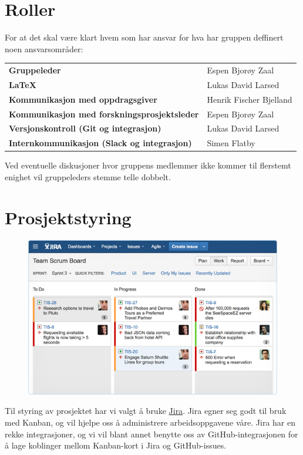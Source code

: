 \section{Roller}
For at det skal være klart hvem som har ansvar for hva har gruppen deffinert noen ansvarsområder:
\begin{flushleft}
\renewcommand{\arraystretch}{1.5}
\begin{tabular}[ht]{@{}ll@{}}
\textbf{Gruppeleder} & Espen Bjorøy Zaal \\
\textbf{LaTeX} & Lukas David Larsed \\
\textbf{Kommunikasjon med oppdragsgiver} & Henrik Fischer Bjelland \\
\textbf{Kommunikasjon med forskningsprosjektsleder} & Espen Bjorøy Zaal \\
\textbf{Versjonskontroll (Git og integrasjon)} & Lukas David Larsed \\
\textbf{Internkommunikasjon (Slack og integrasjon)} & Simen Flatby \\
\end{tabular} 
\end{flushleft}
Ved eventuelle diskusjoner hvor gruppens medlemmer ikke kommer til flerstemt enighet vil gruppeleders stemme telle dobbelt.

\section{Prosjektstyring}
\begin{figure}
\vspace{-0.5cm}
\includegraphics[scale=0.5, keepaspectratio]{./img/arbeidsmetodikk/jira_kanban.png}
\end{figure}
Til styring av prosjektet har vi valgt å bruke \href{https://www.atlassian.com/software/jira}{Jira}. Jira egner seg godt til bruk med Kanban, og vil hjelpe oss å administrere arbeidsoppgavene våre. Jira har en rekke integrasjoner, og vi vil blant annet benytte oss av GitHub-integrasjonen for å lage koblinger mellom Kanban-kort i Jira og GitHub-issues.
